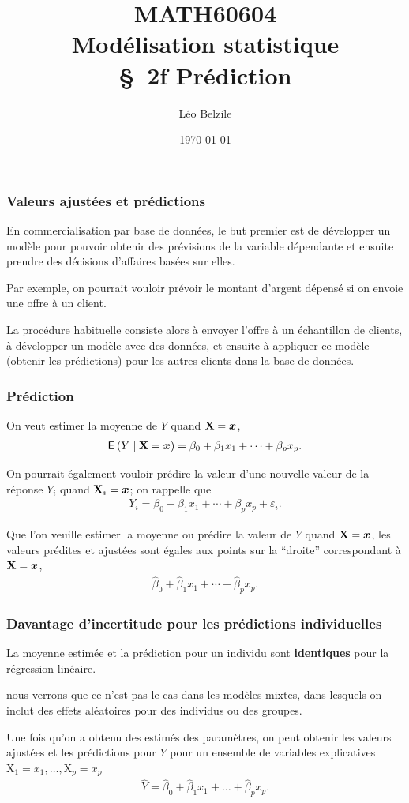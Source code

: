 \documentclass[xcolor={dvipsnames}]{beamer}
\title[\color{white}{MATH60604 \S~2f Prédiction}]{MATH60604 \\Modélisation statistique \\ \S~2f  Prédiction}
\author{Léo Belzile}
\date{\today}
\institute{HEC Montréal\\
Département de sciences de la décision}
\date{}
\begin{document}
\frame{\titlepage}

\begin{frame}
\frametitle{Valeurs ajustées et prédictions}
\bi
\item En commercialisation par base de données, le but
premier est de développer un modèle pour pouvoir obtenir des prévisions
de la variable dépendante et ensuite prendre des décisions d’affaires basées
sur elles.
\item 
Par exemple, on pourrait vouloir prévoir le montant d’argent dépensé si on
envoie une offre à un client.
\item La procédure habituelle consiste alors à envoyer l’offre à un échantillon de clients, à développer un modèle avec des données, et ensuite à appliquer ce modèle (obtenir les prédictions) pour les autres clients dans la base de
données.
\ei
\end{frame}



\begin{frame}
\frametitle{Prédiction}
\bi
\item On veut estimer la \alert{moyenne de $Y$} quand $\mathbf{X}=\boldsymbol {x}$,
\begin{align*}
{\mathsf E}_{}\left(Y\mid \mathbf{X}=\boldsymbol {x}\right)=\beta_0+\beta_1x_1 + \cdots + \beta_px_p.\end{align*}
\item On pourrait également vouloir \alert{prédire la valeur} d'une nouvelle valeur de la réponse $Y_i$ quand $\mathbf{X}_i=\boldsymbol {x}$; on rappelle que
\begin{align*}
Y_i=\beta_0+\beta_1x_1 + \cdots + \beta_px_p +\varepsilon_i.
\end{align*}
\item Que l'on veuille estimer la \alert{moyenne} ou prédire la \alert{valeur} de $Y$ quand $\mathbf{X}=\boldsymbol {x}$, les valeurs prédites et ajustées sont égales aux points sur la ``droite'' correspondant à $\mathbf{X}=\boldsymbol {x}$,
\begin{align*}
\hat{\beta}_0+\hat{\beta}_1x_{1} + \cdots + \hat{\beta}_px_{p}.
\end{align*}

\ei
\end{frame}
\begin{frame}
\frametitle{Davantage d'incertitude pour les prédictions individuelles}
\bi 
\item La moyenne estimée et la prédiction pour un individu sont \textbf{identiques} pour la régression linéaire.
\bi \item nous verrons que ce n'est pas le cas dans les modèles mixtes, dans lesquels on inclut des effets aléatoires pour des individus ou des groupes.
\ei
\item Une fois qu'on a obtenu des estimés des paramètres, on peut obtenir les valeurs ajustées et les prédictions pour
$Y$ pour un ensemble de variables explicatives $\mathrm{X}_1=x_1, \ldots,\mathrm{X}_p=x_p$
\begin{align*}
\hat{Y}=\hat{\beta}_0 +\hat{\beta}_1 x_1+\ldots+\hat{\beta}_px_p.
\end{align*}
\ei
\end{frame}
\end{document}
